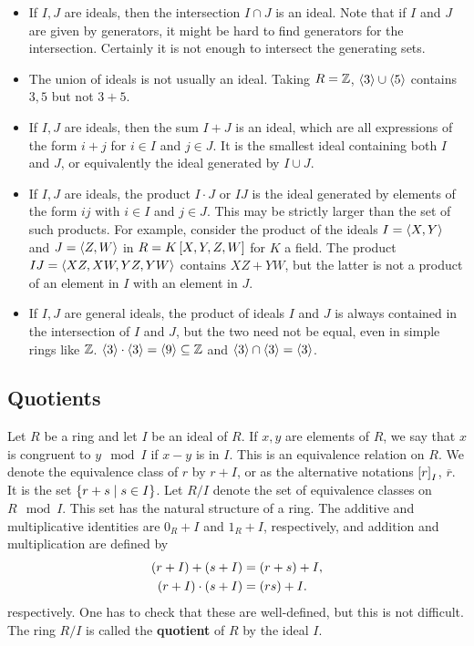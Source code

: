 \begin{example2}
\hfill
\begin{itemize}
\item If $ I, J $ are ideals, then the intersection $ I \cap J $ is an ideal. Note that if $ I $ and $ J $ are given by generators, it might be hard to find generators for the intersection. Certainly it is not enough to intersect the generating sets.
\item The union of ideals is not usually an ideal. Taking $ R = \Z $, $ \ab{3} \cup \ab{5} $ contains $ 3, 5 $ but not $ 3 + 5 $.
\item If $ I, J $ are ideals, then the sum $ I + J $ is an ideal, which are all expressions of the form $ i + j $ for $ i \in I $ and $ j \in J $. It is the smallest ideal containing both $ I $ and $ J $, or equivalently the ideal generated by $ I \cup J $.
\item If $ I, J $ are ideals, the product $ I \cdot J $ or $ IJ $ is the ideal generated by elements of the form $ ij $ with $ i \in I $ and $ j \in J $. This may be strictly larger than the set of such products. For example, consider the product of the ideals $ I = \ab{X, Y} $ and $ J = \ab{Z, W} $ in $ R = K\sb{X, Y, Z, W} $ for $ K $ a field. The product $ IJ = \ab{XZ, XW, YZ, YW} $ contains $ XZ + YW $, but the latter is not a product of an element in $ I $ with an element in $ J $.
\item If $ I, J $ are general ideals, the product of ideals $ I $ and $ J $ is always contained in the intersection of $ I $ and $ J $, but the two need not be equal, even in simple rings like $ \Z $. $ \ab{3} \cdot \ab{3} = \ab{9} \subseteq \Z $ and $ \ab{3} \cap \ab{3} = \ab{3} $.
\end{itemize}
\end{example2}

\subsection{Quotients}

Let $ R $ be a ring and let $ I $ be an ideal of $ R $. If $ x, y $ are elements of $ R $, we say that $ x $ is congruent to $ y \mod I $ if $ x - y $ is in $ I $. This is an equivalence relation on $ R $. We denote the equivalence class of $ r $ by $ r + I $, or as the alternative notations $ \sb{r}_I $, $ \overline{r} $. It is the set $ \cb{r + s \mid s \in I} $. Let $ R / I $ denote the set of equivalence classes on $ R \mod I $. This set has the natural structure of a ring. The additive and multiplicative identities are $ 0_R + I $ and $ 1_R + I $, respectively, and addition and multiplication are defined by
\begin{align*}
\rb{r + I} + \rb{s + I} & = \rb{r + s} + I, \\
\rb{r + I} \cdot \rb{s + I} & = \rb{rs} + I.
\end{align*}
respectively. One has to check that these are well-defined, but this is not difficult. The ring $ R / I $ is called the \textbf{quotient} of $ R $ by the ideal $ I $.

